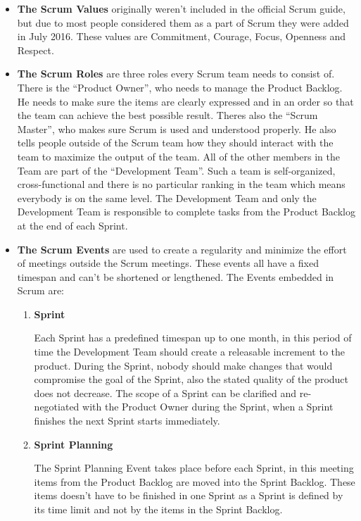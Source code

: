 \begin{itemize}
    \item \textbf{The Scrum Values} originally weren't included in the official Scrum guide, but due to most people considered them as a part of Scrum they were added in July 2016. These values are Commitment, Courage, Focus, Openness and Respect.

    \item \textbf{The Scrum Roles} are three roles every Scrum team needs to consist of. There is the ``Product Owner'', who needs to manage the Product Backlog. He needs to make sure the items are clearly expressed and in an order so that the team can achieve the best possible result. Theres also the ``Scrum Master'', who makes sure Scrum is used and understood properly. He also tells people outside of the Scrum team how they should interact with the team to maximize the output of the team. All of the other members in the Team are part of the ``Development Team''. Such a team is self-organized, cross-functional and there is no particular ranking in the team which means everybody is on the same level. The Development Team and only the Development Team is responsible to complete tasks from the Product Backlog at the end of each Sprint.

    \item \textbf{The Scrum Events} are used to create a regularity and minimize the effort of meetings outside the Scrum meetings. These events all have a fixed timespan and can't be shortened or lengthened. The Events embedded in Scrum are:
    \begin{enumerate}
        \item \textbf{Sprint}

        Each Sprint has a predefined timespan up to one month, in this period of time the Development Team should create a releasable increment to the product. During the Sprint, nobody should make changes that would compromise the goal of the Sprint, also the stated quality of the product does not decrease. The scope of a Sprint can be clarified and re-negotiated with the Product Owner during the Sprint, when a Sprint finishes the next Sprint starts immediately.

        \item \textbf{Sprint Planning}

        The Sprint Planning Event takes place before each Sprint, in this meeting items from the Product Backlog are moved into the Sprint Backlog. These items doesn't have to be finished in one Sprint as a Sprint is defined by its time limit and not by the items in the Sprint Backlog.


\end{enumerate}
\end{itemize}
